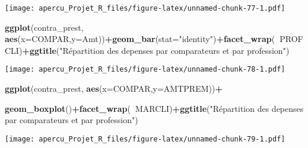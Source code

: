 \documentclass[
]{article}
\newenvironment{Shaded}{\begin{snugshade}}{\end{snugshade}}
\newcommand{\DataTypeTok}[1]{\textcolor[rgb]{0.13,0.29,0.53}{#1}}
\newcommand{\KeywordTok}[1]{\textcolor[rgb]{0.13,0.29,0.53}{\textbf{#1}}}
\newcommand{\NormalTok}[1]{#1}
\newcommand{\OperatorTok}[1]{\textcolor[rgb]{0.81,0.36,0.00}{\textbf{#1}}}
\newcommand{\StringTok}[1]{\textcolor[rgb]{0.31,0.60,0.02}{#1}}
\begin{document}
\texttt{[image: apercu\_Projet\_R\_files/figure-latex/unnamed-chunk-77-1.pdf]}

\begin{Shaded}
\begin{Highlighting}[]
\KeywordTok{ggplot}\NormalTok{(contra_prest, }\KeywordTok{aes}\NormalTok{(}\DataTypeTok{x=}\NormalTok{COMPAR,}\DataTypeTok{y=}\NormalTok{Amt))}\OperatorTok{+}\KeywordTok{geom_bar}\NormalTok{(}\DataTypeTok{stat=}\StringTok{"identity"}\NormalTok{)}\OperatorTok{+}\KeywordTok{facet_wrap}\NormalTok{(}\OperatorTok{~}\NormalTok{PROFCLI)}\OperatorTok{+}\KeywordTok{ggtitle}\NormalTok{(}\StringTok{"Répartition des depenses par comparateurs et  par profession"}\NormalTok{)}
\end{Highlighting}
\end{Shaded}

\texttt{[image: apercu\_Projet\_R\_files/figure-latex/unnamed-chunk-78-1.pdf]}

\begin{Shaded}
\begin{Highlighting}[]
\KeywordTok{ggplot}\NormalTok{(contra_prest, }\KeywordTok{aes}\NormalTok{(}\DataTypeTok{x=}\NormalTok{COMPAR,}\DataTypeTok{y=}\NormalTok{AMTPREM))}\OperatorTok{+}

\KeywordTok{geom_boxplot}\NormalTok{()}\OperatorTok{+}\KeywordTok{facet_wrap}\NormalTok{(}\OperatorTok{~}\NormalTok{MARCLI)}\OperatorTok{+}\KeywordTok{ggtitle}\NormalTok{(}\StringTok{"Répartition des depenses par comparateurs et  par profession"}\NormalTok{)}
\end{Highlighting}
\end{Shaded}

\texttt{[image: apercu\_Projet\_R\_files/figure-latex/unnamed-chunk-79-1.pdf]}
\end{document}
